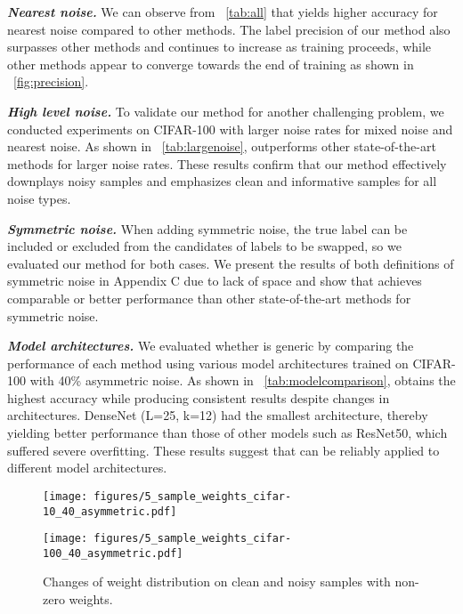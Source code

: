 \noindent\emph{\textbf{Nearest noise.}}
We can observe from \tablename~\ref{tab:all} that \prgname{} yields higher accuracy for nearest noise compared to other methods. The label precision of our method also surpasses other methods and continues to increase as training proceeds, while other methods appear to converge towards the end of training as shown in \figurename~\ref{fig:precision}.


\noindent\emph{\textbf{High level noise.}}
To validate our method for another challenging problem, we conducted experiments on CIFAR-100 with larger noise rates for mixed noise and nearest noise. As shown in \tablename~\ref{tab:largenoise}, \prgname{} outperforms other state-of-the-art methods for larger noise rates. These results confirm that our method effectively downplays noisy samples and emphasizes clean and informative samples for all noise types.


\noindent\emph{\textbf{Symmetric noise.}} When adding symmetric noise, the true label can be included or excluded from the candidates of labels to be swapped, so we evaluated our method for both cases. We present the results of both definitions of symmetric noise in Appendix C due to lack of space and show that \prgname{} achieves comparable or better performance than other state-of-the-art methods for symmetric noise. 

\noindent\emph{\textbf{Model architectures.}}
We evaluated whether \prgname{} is generic by comparing the performance of each method using various model architectures trained on CIFAR-100 with 40\% asymmetric noise. As shown in \tablename~\ref{tab:modelcomparison}, \prgname{} obtains the highest accuracy while producing consistent results despite changes in architectures. DenseNet (L=25, k=12) had the smallest architecture, thereby yielding better performance than those of other models such as ResNet50, which suffered severe overfitting. These results suggest that \prgname{} can be reliably applied to different model architectures.


\begin{figure}[t]
\centering
\begin{minipage}[t]{.48\textwidth}
\centering  
    \texttt{[image: figures/5\_sample\_weights\_cifar-10\_40\_asymmetric.pdf]}
    \label{fig:sample-weights-10}
\end{minipage}\hspace{10pt}
\begin{minipage}[t]{.48\textwidth}
\centering
    \texttt{[image: figures/5\_sample\_weights\_cifar-100\_40\_asymmetric.pdf]}
    \label{fig:sample-weights-100}
\end{minipage}

\caption{Changes of weight distribution on clean and noisy samples with non-zero weights. }
\label{fig:sample-weights}
\end{figure}







